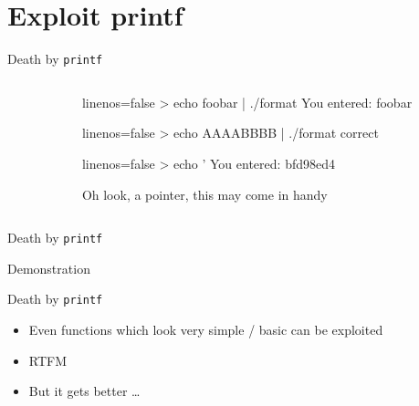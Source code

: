 \documentclass[beamer]{uibk}
\begin{document}
\section{Exploit printf}

\begin{frame}[fragile]{Death by \texttt{printf}}
    \begin{columns}
        \begin{column}{0.5\textwidth}
        \end{column}
        \begin{column}{0.5\textwidth}
            \pause
            \begin{code*}{linenos=false}
                > echo foobar | ./format
                You entered:
                foobar
            \end{code*}
            \bigskip\pause
            \begin{code*}{linenos=false}
                > echo AAAABBBB | ./format
                correct
            \end{code*}
            \bigskip\pause
            \begin{code*}{linenos=false}
                > echo '%
                You entered:
                bfd98ed4
            \end{code*}
            \medskip
            Oh look, a pointer, this may come in handy
        \end{column}
    \end{columns}
\end{frame}

\begin{frame}{Death by \texttt{printf}}
    \begin{center}
        \huge Demonstration
    \end{center}
\end{frame}

\begin{frame}{Death by \texttt{printf}}
    \begin{itemize}
        \item Even functions which look very simple / basic can be exploited
        \bigskip
        \item RTFM
        \bigskip
        \pause
        \item But it gets better \dots
    \end{itemize}
\end{frame}
\end{document}
